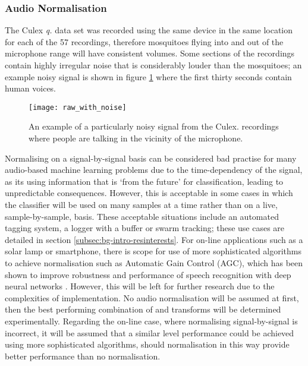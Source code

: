         \subsubsection{Audio Normalisation}
        \label{subsubsec:exp-clf-ass-aud}
            The Culex \textit{q.} data set was recorded using the same device in the same location for each of the 57 recordings, therefore mosquitoes flying into and out of the microphone range will have consistent volumes. Some sections of the recordings contain highly irregular noise that is considerably louder than the mosquitoes; an example noisy signal is shown in figure \ref{fig:exp-clf-audio-noisy} where the first thirty seconds contain human voices.
            \begin{figure}[ht]
                \centering
                \texttt{[image: raw\_with\_noise]}
                \caption{An example of a particularly noisy signal from the Culex. recordings where people are talking in the vicinity of the microphone.}
                \label{fig:exp-clf-audio-noisy}
            \end{figure}
            Normalising on a signal-by-signal basis can be considered bad practise for many audio-based machine learning problems due to the time-dependency of the signal, as its using information that is `from the future' for classification, leading to unpredictable consequences. However, this is acceptable in some cases in which the classifier will be used on many samples at a time rather than on a live, sample-by-sample, basis. These acceptable situations include an automated tagging system, a logger with a buffer or swarm tracking; these use cases are detailed in section \ref{subsec:bg-intro-resinterests}. For on-line applications such as a solar lamp or smartphone, there is scope for use of more sophisticated algorithms to achieve normalisation such as Automatic Gain Control (AGC), which has been shown to improve robustness and performance of speech recognition with deep neural networks \cite{Prabhavalkar2015}. However, this will be left for further research due to the complexities of implementation. No audio normalisation will be assumed at first, then the best performing combination of  and  transforms will be determined experimentally. Regarding the on-line case, where normalising signal-by-signal is incorrect, it will be assumed that a similar level performance could be achieved using more sophisticated algorithms, should normalisation in this way provide better performance than no normalisation.

